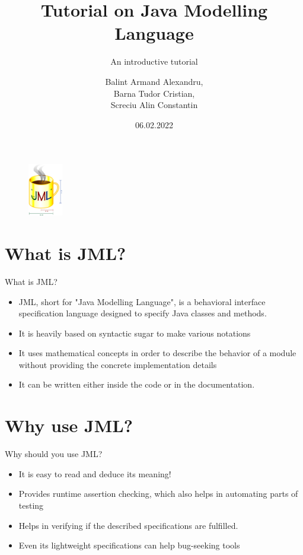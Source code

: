 \documentclass{beamer}
\author{Balint Armand Alexandru,\\
Barna Tudor Cristian,\\
Screciu Alin Constantin}
\title{Tutorial on Java Modelling Language}
\subtitle{An introductive tutorial}
\institute{West University of Timisoara}
\date{06.02.2022}
\begin{document}
\kaishu
\begin{frame}
    \titlepage
    \begin{figure}[htpb]
        \vspace*{-0.5cm}
        \begin{center}
            \includegraphics[width=1.5cm,height=2.3cm]{pic/jml-logo-med.png}
        \end{center}
    \end{figure}
\end{frame}

\begin{frame}
    \tableofcontents[sectionstyle=show,subsectionstyle=show/shaded/hide,subsubsectionstyle=show/shaded/hide]
\end{frame}


\section{What is JML?}

\begin{frame}{What is JML?}
    \begin{itemize}[<+-| alert@+>]
        \item JML, short for "Java Modelling Language", is a behavioral interface specification language designed to specify Java classes and methods.
        \item It is heavily based on syntactic sugar to make various notations
        \item It uses mathematical concepts in order to describe the behavior of a module without providing the concrete implementation details
        \item It can be written either inside the code or in the documentation.
    \end{itemize}
\end{frame}


\section{Why use JML?}

\begin{frame}{Why should you use JML?}
    \begin{itemize}[<+-| alert@+>]
        \item It is easy to read and deduce its meaning!
        \item Provides runtime assertion checking, which also helps in automating parts of testing
        \item Helps in verifying if the described specifications are fulfilled.
        \item Even its lightweight specifications can help bug-seeking tools
    \end{itemize}
\end{frame}
\end{document}
